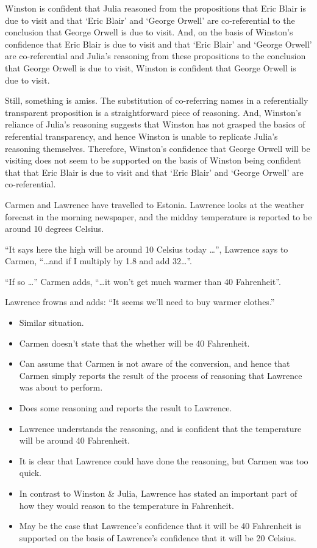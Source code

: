 \documentclass[10pt]{article}
\begin{document}
Winston is confident that Julia reasoned from the propositions that Eric Blair is due to visit and that `Eric Blair' and `George Orwell' are co-referential to the conclusion that George Orwell is due to visit.
And, on the basis of Winston's confidence that Eric Blair is due to visit and that `Eric Blair' and `George Orwell' are co-referential and Julia's reasoning from these propositions to the conclusion that George Orwell is due to visit, Winston is confident that George Orwell is due to visit.

Still, something is amiss.
The substitution of co-referring names in a referentially transparent proposition is a straightforward piece of reasoning.
And, Winston's reliance of Julia's reasoning suggests that Winston has not grasped the basics of referential transparency, and hence Winston is unable to replicate Julia's reasoning themselves.
Therefore, Winston's confidence that George Orwell will be visiting does not seem to be supported on the basis of Winston being confident that that Eric Blair is due to visit and that `Eric Blair' and `George Orwell' are co-referential.

\begin{scenario}
  Carmen and Lawrence have travelled to Estonia.
  Lawrence looks at the weather forecast in the morning newspaper, and the midday temperature is reported to be around 10 degrees Celsius.

  ``It says here the high will be around 10 Celsius today \dots'', Lawrence says to Carmen, ``\dots and if I multiply by 1.8 and add 32\dots''.

  ``If so \dots'' Carmen adds, ``\dots it won't get much warmer than 40 Fahrenheit''.

  Lawrence frowns and adds: ``It seems we'll need to buy warmer clothes.''
\end{scenario}

\begin{itemize}
\item Similar situation.
\item Carmen doesn't state that the whether will be 40 Fahrenheit.
\item Can assume that Carmen is not aware of the conversion, and hence that Carmen simply reports the result of the process of reasoning that Lawrence was about to perform.
\item Does some reasoning and reports the result to Lawrence.
\item Lawrence understands the reasoning, and is confident that the temperature will be around 40 Fahrenheit.
\item It is clear that Lawrence could have done the reasoning, but Carmen was too quick.
\item In contrast to Winston \& Julia, Lawrence has stated an important part of how they would reason to the temperature in Fahrenheit.
\item May be the case that Lawrence's confidence that it will be 40 Fahrenheit is supported on the basis of Lawrence's confidence that it will be 20 Celsius.
\end{itemize}
\end{document}
